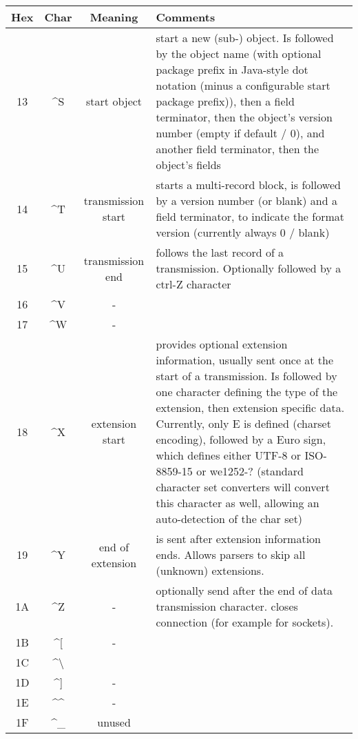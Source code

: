 \documentclass[11pt,a4paper,oneside]{article}
\begin{document}
\begin{tabular}{|c|c|c|p{8cm}|}
\hline
Hex & Char & Meaning & Comments \\
\hline
13 & \textasciicircum S & start object       & start a new (sub-) object. Is
followed by the object name (with optional package prefix in Java-style dot notation (minus a
configurable start package prefix)), then a field terminator, then the object's
version number (empty if default / 0), and another field terminator, then the
object's fields \\
14 & \textasciicircum T & transmission start & starts a multi-record block, is
followed by a version number (or blank) and a field terminator, to indicate
the format version (currently always 0 / blank) \\
15 & \textasciicircum U & transmission end   & follows the last record of a
transmission. Optionally followed by a ctrl-Z character \\
16 & \textasciicircum V &       -            & \\
17 & \textasciicircum W &       -            & \\
18 & \textasciicircum X & extension start   & provides optional extension information,
usually sent once at the start of a transmission. Is followed by one character
defining the type of the extension, then extension specific data. Currently,
only E is defined (charset encoding), followed by a Euro sign, which defines
either UTF-8 or ISO-8859-15 or we1252-? (standard character set converters will
convert this character as well, allowing an auto-detection of the char set)\\
19 & \textasciicircum Y & end of extension  & is sent after extension information ends.
Allows parsers to skip all (unknown) extensions. \\
1A & \textasciicircum Z & - & optionally send after the end of data
transmission character. closes connection (for example for sockets). \\
1B & \textasciicircum [ &       -            & \\
1C & \textasciicircum \textbackslash &                   & \\
1D & \textasciicircum ] & -& \\
1E & \textasciicircum \textasciicircum &   -                & \\
1F & \textasciicircum \_ &  unused         & \\
\hline
\end{tabular}

\vspace{8mm}
\end{document}
